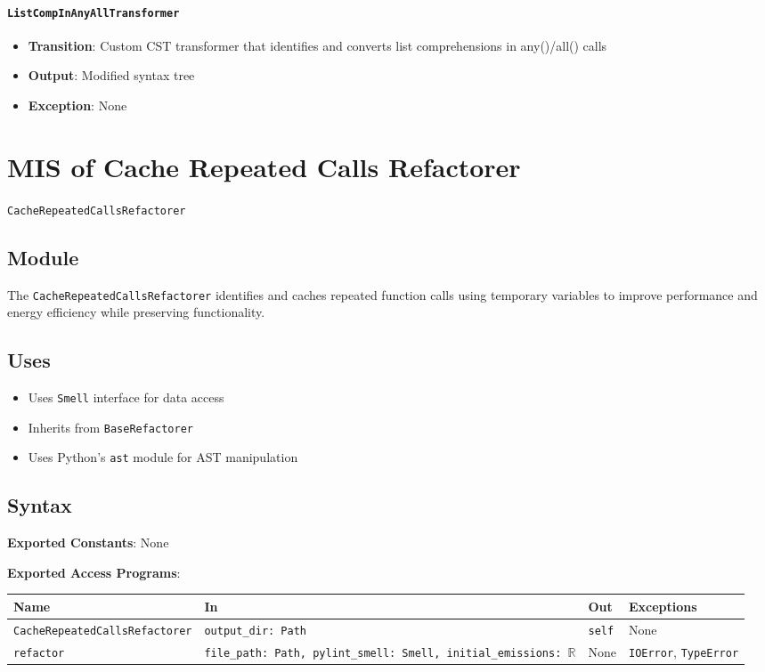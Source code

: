 \documentclass[12pt, titlepage]{article}
\begin{document}
\paragraph{\texttt{ListCompInAnyAllTransformer}}
\begin{itemize}
\item \textbf{Transition}: Custom CST transformer that identifies and converts list comprehensions in any()/all() calls
\item \textbf{Output}: Modified syntax tree
\item \textbf{Exception}: None
\end{itemize}

\newpage

\section{MIS of Cache Repeated Calls Refactorer} \label{mis:CacheCalls}

\texttt{CacheRepeatedCallsRefactorer}

\subsection{Module}
The \texttt{CacheRepeatedCallsRefactorer} identifies and caches repeated function calls using temporary variables to improve performance and energy efficiency while preserving functionality.

\subsection{Uses}
\begin{itemize}
\item Uses \texttt{Smell} interface for data access
\item Inherits from \texttt{BaseRefactorer}
\item Uses Python's \texttt{ast} module for AST manipulation
\end{itemize}

\subsection{Syntax}
\noindent
\textbf{Exported Constants}: None

\noindent
\textbf{Exported Access Programs}:\\
\begin{tabularx}{\linewidth}{|l|>{\raggedright\arraybackslash}X|l|l|}
  \hline
  \textbf{Name} & \textbf{In} & \textbf{Out} & \textbf{Exceptions} \\\hline
  \texttt{CacheRepeatedCallsRefactorer} & \texttt{output\_dir: Path} & \texttt{self} & None \\
  \hline
  \texttt{refactor} & \texttt{file\_path: Path, pylint\_smell: Smell, initial\_emissions: $\mathbb{R}$} & None & \texttt{IOError}, \texttt{TypeError} \\
  \hline
\end{tabularx}
\end{document}
